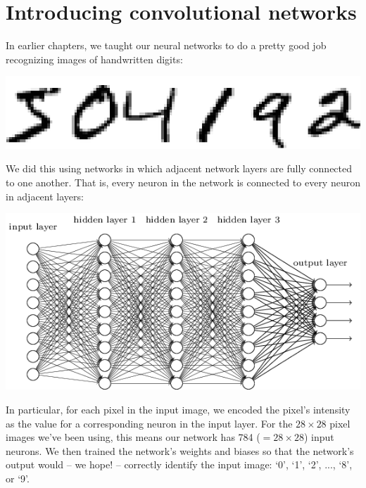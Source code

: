 \documentclass[a4paper,twoside,10pt]{book}
\begin{document}
\section{Introducing convolutional networks}
\label{subseq:cnn}
In earlier chapters, we taught our neural networks to do a pretty good job recognizing images of handwritten digits:
\begin{center}
	\includegraphics[width=0.4\linewidth]{figures/ch1/digits}
\end{center}
We did this using networks in which adjacent network layers are fully connected to one another. That is, every neuron in the network is connected to every neuron in adjacent layers:
\begin{center}
	\includegraphics[width=\linewidth]{figures/ch6/tikz41}
\end{center}
In particular, for each pixel in the input image, we encoded the pixel's intensity as the value for a corresponding neuron in the input layer. For the $28\times28$ pixel images we've been using, this means our network has 784 ($=28\times28$) input neurons. We then trained the network's weights and biases so that the network's output would -- we hope! -- correctly identify the input image: `0', `1', `2', ..., `8', or `9'.
\end{document}
